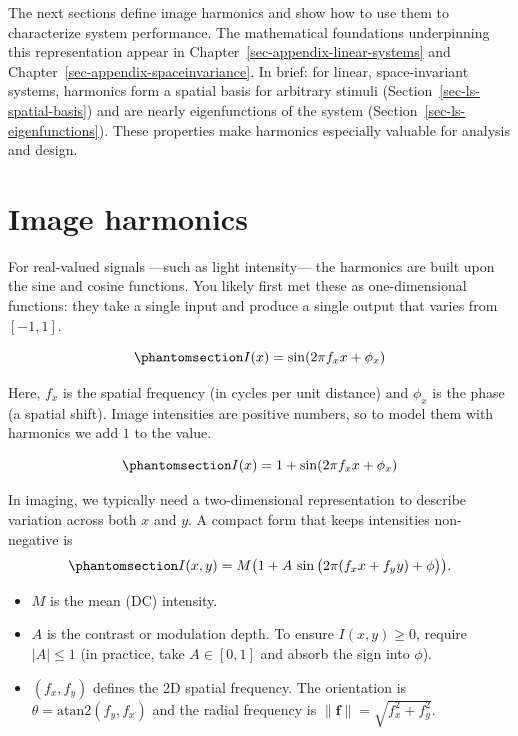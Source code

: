 \documentclass[
  letterpaper,
]{book}
\providecommand{\tightlist}{%
  \setlength{\itemsep}{0pt}\setlength{\parskip}{0pt}}\usepackage{longtable,booktabs,array}
\begin{document}
The next sections define image harmonics and show how to use them to
characterize system performance. The mathematical foundations
underpinning this representation appear in
Chapter~\ref{sec-appendix-linear-systems} and
Chapter~\ref{sec-appendix-spaceinvariance}. In brief: for linear,
space-invariant systems, harmonics form a spatial basis for arbitrary
stimuli (Section~\ref{sec-ls-spatial-basis}) and are nearly
eigenfunctions of the system (Section~\ref{sec-ls-eigenfunctions}).
These properties make harmonics especially valuable for analysis and
design.

\section{Image harmonics}\label{sec-optics-harmonics}

For real-valued signals ---such as light intensity--- the harmonics are
built upon the sine and cosine functions. You likely first met these as
one-dimensional functions: they take a single input and produce a single
output that varies from \([-1,1]\).

\begin{equation}\phantomsection\label{eq-harmonics-1d}{
I(x) = \sin(2\pi f_x x + \phi_x)
}\end{equation}

Here, \(f_x\) is the spatial frequency (in cycles per unit distance) and
\(\phi_x\) is the phase (a spatial shift). Image intensities are
positive numbers, so to model them with harmonics we add \(1\) to the
value.

\begin{equation}\phantomsection\label{eq-harmonics-1d-v2}{
I(x) = 1 + \sin(2\pi f_x x + \phi_x)
}\end{equation}

In imaging, we typically need a two-dimensional representation to
describe variation across both \(x\) and \(y\). A compact form that
keeps intensities non-negative is
\begin{equation}\phantomsection\label{eq-harmonics-2d}{
I(x,y) = M\big(1 + A \,\sin\big(2\pi (f_x x + f_y y) + \phi\big)\big).
}\end{equation}

\begin{itemize}
\tightlist
\item
  \(M\) is the mean (DC) intensity.
\item
  \(A\) is the contrast or modulation depth. To ensure \(I(x,y)\ge0\),
  require \(|A|\le 1\) (in practice, take \(A\in[0,1]\) and absorb the
  sign into \(\phi\)).
\item
  \((f_x,f_y)\) defines the 2D spatial frequency. The orientation is
  \(\theta=\mathrm{atan2}(f_y,f_x)\) and the radial frequency is
  \(\| \mathbf{f} \| = \sqrt{f_x^2+f_y^2}\).
\end{itemize}
\end{document}
